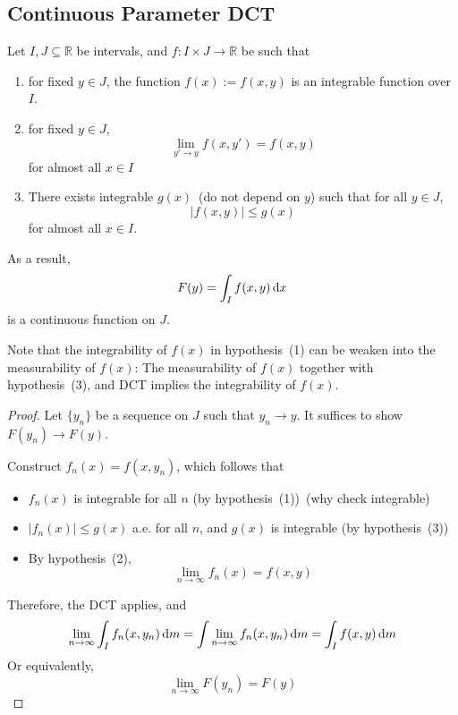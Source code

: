\subsection{Continuous Parameter DCT}

\begin{theorem}\label{The:12:4}
Let $I,J\subseteq\mathbb{R}$ be intervals, and 
$f:I\times J\to\mathbb{R}$ be such that 
\begin{enumerate}
\item
for fixed $y\in J$, the function $f(x):=f(x,y)$ is an integrable function over $I$.
\item
for fixed $y\in J$, 
\[
\lim_{y'\to y}f(x,y')=f(x,y)
\]
for almost all $x\in I$
\item
There exists integrable $g(x)$~(do not depend on $y$) such that for all $y\in J$,
\[
|f(x,y)|\le g(x)
\]
for almost all $x\in I$.
\end{enumerate}
As a result, 
\[
F(y) = \int_If(x,y)\,\mathrm{d} x
\]
is a continuous function on $J$.
\end{theorem}
\begin{remark}
Note that the integrability of $f(x)$ in hypothesis~(1) can be weaken into the measurability of $f(x)$:
The measurability of $f(x)$ together with hypothesis~(3), and DCT implies the integrability of $f(x)$.
\end{remark}

\begin{proof}
Let $\{y_n\}$ be a sequence on $J$ such that $y_n\to y$.
It suffices to show $F(y_n)\to F(y)$.

Construct $f_n(x) = f(x,y_n)$, which follows that
\begin{itemize}
\item
$f_n(x)$ is integrable for all $n$ (by hypothesis~(1))~(why check integrable)
\item
$|f_n(x)|\le g(x)$ a.e. for all $n$, and $g(x)$ is integrable (by hypothesis~(3))
\item
By hypothesis~(2),
\[
\lim_{n\to\infty}f_n(x) = f(x,y)
\]
\end{itemize}

Therefore, the DCT applies, and
\[
\lim_{n\to\infty}\int_If_n(x,y_n)\,\mathrm{d} m =\int\lim_{n\to\infty} f_n(x,y_n)\,\mathrm{d} m=\int_If(x,y)\,\mathrm{d} m
\]
Or equivalently,
\[
\lim_{n\to\infty}F(y_n)= F(y)
\]
\end{proof}

